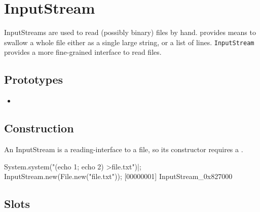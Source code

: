 \section{InputStream}

InputStreams are used to read (possibly binary) files by hand.
 provides means to swallow a whole file either as a
single large string, or a list of lines.  \lstinline|InputStream|
provides a more fine-grained interface to read files.

\subsection{Prototypes}
\begin{itemize}
\item {}
\end{itemize}

\subsection{Construction}

An InputStream is a reading-interface to a file, so its constructor
requires a .

\begin{urbiscript}
System.system("(echo 1; echo 2) >file.txt")|;
InputStream.new(File.new("file.txt"));
[00000001] InputStream_0x827000
\end{urbiscript}

\subsection{Slots}

